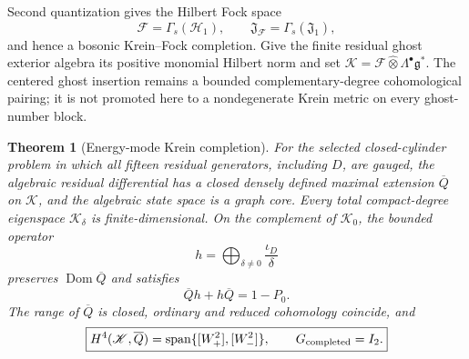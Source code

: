 \documentclass[11pt]{article}
\newtheorem{theorem}{Theorem}[section]
\theoremstyle{definition}
\theoremstyle{remark}
\newcommand{\g}{\mathfrak g}
\begin{document}
Second quantization gives the Hilbert Fock space
\begin{equation}
 \mathscr F=\Gamma_s(\mathscr H_1),
 \qquad
 \mathfrak J_{\mathscr F}=\Gamma_s(\mathfrak J_1),
\end{equation}
and hence a bosonic Krein--Fock completion.  Give the finite residual ghost
exterior algebra its positive monomial Hilbert norm and set
$\mathscr K=\mathscr F\widehat\otimes\Lambda^\bullet\g^*$.  The centered
ghost insertion remains a bounded complementary-degree cohomological
pairing; it is not promoted here to a nondegenerate Krein metric on every
ghost-number block.

\begin{theorem}[Energy-mode Krein completion]
\label{thm:energy-mode-completion}
For the selected closed-cylinder problem in which all fifteen residual
generators, including $D$, are gauged, the algebraic residual differential
has a closed densely defined maximal extension $\overline Q$ on
$\mathscr K$, and the algebraic state space is a graph core.  Every total
compact-degree eigenspace $\mathscr K_\delta$ is finite-dimensional.  On
the complement of $\mathscr K_0$, the bounded operator
\begin{equation}
 h=\bigoplus_{\delta\ne0}\frac{\iota_D}{\delta}
\end{equation}
preserves $\operatorname{Dom}\overline Q$ and satisfies
\begin{equation}
 \overline Qh+h\overline Q=1-P_0.
\end{equation}
The range of $\overline Q$ is closed, ordinary and reduced cohomology
coincide, and
\begin{equation}
 \boxed{
 H^4(\mathscr K,\overline Q)
 =\operatorname{span}\{[W_+^2],[W_-^2]\},
 \qquad G_{\rm completed}=I_2.}
\end{equation}
\end{theorem}
\end{document}

